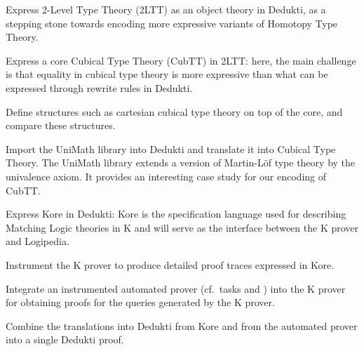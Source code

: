 \begin{workpackage}
\begin{tasklist}
\begin{task}[id=hott,
  title=Express Cubical Type Theory in Dedukti,
  shorttitle=CuTT,
  lead=Inr, %
  InrRM=46, %
  BirRM=3,  %
  LeeRM=3,  %
  wphases=1-48,
  ]
  \vspace{-5mm}
  \begin{compactitem}
  \item Express 2-Level Type Theory (2LTT) as an object theory in Dedukti, as
    a stepping stone towards encoding more expressive variants of Homotopy Type
    Theory.
  \item Express a core Cubical Type Theory (CubTT) in 2LTT: here, the main challenge is
    that equality in cubical type theory is more expressive than what can be
    expressed through rewrite rules in Dedukti.
  \item Define structures such as cartesian cubical type theory on top of the
    core, and compare these structures.
  \item Import the UniMath library into Dedukti and translate it into Cubical
    Type Theory. The UniMath library extends a version of
    Martin-Löf type theory by the univalence axiom. It provides an interesting
    case study for our encoding of CubTT.
  \end{compactitem}
\end{task}

\begin{task}[id=matching,
  title=Express Matching Logic in Dedukti and instrument the K prover,
  shorttitle=K,
  lead=Ias,
  IasRM=6,
  RunRM=7,
  wphases=1-42,
  ]
  \vspace{-5mm}
  \begin{compactitem}
  \item Express Kore in Dedukti: Kore is the specification language used for
    describing Matching Logic theories in K and will serve as the interface
    between the K prover and Logipedia.
  \item Instrument the K prover to produce detailed proof traces expressed in
    Kore.
  \item Integrate an instrumented automated prover (cf.\ tasks
     and ) into
    the K prover for obtaining proofs for the queries generated by the K prover.
  \item Combine the translations into Dedukti from Kore and from the automated
    prover into a single Dedukti proof.
  \end{compactitem}
\end{task}


\end{tasklist}
\end{workpackage}
